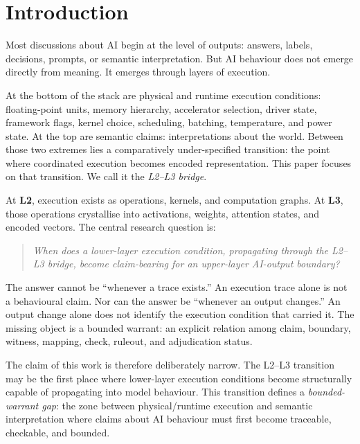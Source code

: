 \documentclass[11pt, a4paper]{article}
\theoremstyle{upldef}
\newcommand{\layer}[1]{\textbf{L#1}}
\begin{document}
\vspace{0.5em}
\noindent\hrulefill
\vspace{0.5em}

\section{Introduction}
\label{sec:intro}

Most discussions about AI begin at the level of outputs: answers,
labels, decisions, prompts, or semantic interpretation. But AI
behaviour does not emerge directly from meaning. It emerges through
layers of execution.

At the bottom of the stack are physical and runtime execution
conditions: floating-point units, memory hierarchy, accelerator
selection, driver state, framework flags, kernel choice, scheduling,
batching, temperature, and power state. At the top are semantic
claims: interpretations about the world. Between those two extremes
lies a comparatively under-specified transition: the point where
coordinated execution becomes encoded representation. This paper
focuses on that transition. We call it the \emph{L2--L3 bridge}.

At \layer{2}, execution exists as operations, kernels, and
computation graphs. At \layer{3}, those operations crystallise into
activations, weights, attention states, and encoded vectors. The
central research question is:

\begin{quote}\itshape
When does a lower-layer execution condition, propagating through the
L2--L3 bridge, become claim-bearing for an upper-layer AI-output
boundary?
\end{quote}

The answer cannot be ``whenever a trace exists.'' An execution trace
alone is not a behavioural claim. Nor can the answer be ``whenever
an output changes.'' An output change alone does not identify the
execution condition that carried it. The missing object is a
bounded warrant: an explicit relation among claim, boundary, witness,
mapping, check, ruleout, and adjudication status.

The claim of this work is therefore deliberately narrow. The L2--L3
transition may be the first place where lower-layer execution
conditions become structurally capable of propagating into model
behaviour. This transition defines a \emph{bounded-warrant gap}:
the zone between physical/runtime execution and semantic
interpretation where claims about AI behaviour must first become
traceable, checkable, and bounded.
\end{document}
